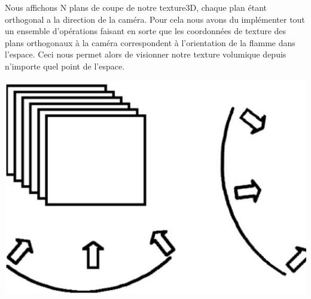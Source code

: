 \documentclass[a4paper,10pt]{article}
\begin{document}
Nous affichons N plans de coupe de notre texture3D, chaque plan étant orthogonal a la direction de la caméra. Pour cela nous avons du implémenter tout un ensemble d'opérations faisant en sorte que les coordonnées de texture des plans orthogonaux à 
la caméra correspondent à l'orientation de la flamme dans l'espace. Ceci nous permet alors de visionner notre texture volumique depuis n'importe quel point de l'espace.\\
\begin{center}
\includegraphics[scale=0.3]{plan_en_coupe.ps}
\end{center}
\end{document}
